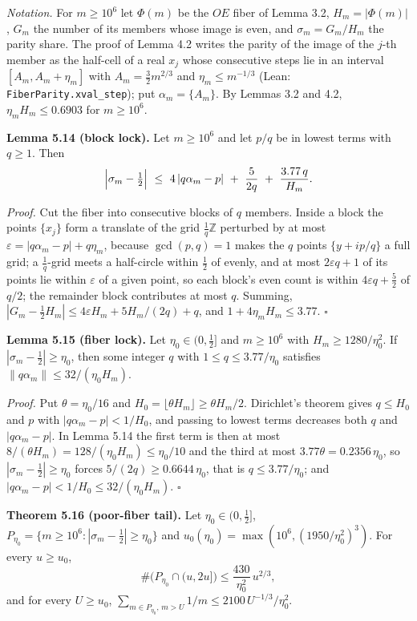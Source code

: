\documentclass[11pt,a4paper]{article}
\begin{document}
\emph{Notation.} For \(m\ge10^6\) let \(\Phi(m)\) be the \(OE\) fiber of
Lemma 3.2, \(H_m=|\Phi(m)|\), \(G_m\) the number of its members whose
image is even, and \(\sigma_m=G_m/H_m\) the parity share. The proof of
Lemma 4.2 writes the parity of the image of the \(j\)-th member as the
half-cell of a real \(x_j\) whose consecutive steps lie in an interval
\([A_m,A_m+\eta_m]\) with \(A_m=\tfrac32m^{2/3}\) and
\(\eta_m\le m^{-1/3}\) (Lean:
\texttt{\nolinkurl{FiberParity.xval_step}}); put \(\alpha_m=\{A_m\}\).
By Lemmas 3.2 and 4.2, \(\eta_mH_m\le0.6903\) for \(m\ge10^6\).

\textbf{Lemma 5.14 (block lock).} Let \(m\ge10^6\) and let \(p/q\) be in
lowest terms with \(q\ge1\). Then \[
\Bigl|\sigma_m-\tfrac12\Bigr|\ \le\
4\,|q\alpha_m-p|\ +\ \frac{5}{2q}\ +\ \frac{3.77\,q}{H_m}.
\]

\emph{Proof.} Cut the fiber into consecutive blocks of \(q\) members.
Inside a block the points \(\{x_j\}\) form a translate of the grid
\(\tfrac1q\mathbb Z\) perturbed by at most
\(\varepsilon=|q\alpha_m-p|+q\eta_m\), because \(\gcd(p,q)=1\) makes the
\(q\) points \(\{y+ip/q\}\) a full grid; a \(\tfrac1q\)-grid meets a
half-circle within \(\tfrac12\) of evenly, and at most
\(2\varepsilon q+1\) of its points lie within \(\varepsilon\) of a given
point, so each block's even count is within \(4\varepsilon q+\tfrac52\)
of \(q/2\); the remainder block contributes at most \(q\). Summing,
\(|G_m-\tfrac12H_m|\le4\varepsilon
H_m+5H_m/(2q)+q\), and \(1+4\eta_mH_m\le3.77\). \(\square\)

\textbf{Lemma 5.15 (fiber lock).} Let \(\eta_0\in(0,\tfrac12]\) and
\(m\ge10^6\) with \(H_m\ge1280/\eta_0^2\). If
\(|\sigma_m-\tfrac12|\ge\eta_0\), then some integer \(q\) with
\(1\le q\le3.77/\eta_0\) satisfies \(\|q\alpha_m\|\le32/(\eta_0H_m)\).

\emph{Proof.} Put \(\theta=\eta_0/16\) and
\(H_0=\lfloor\theta H_m\rfloor\ge
\theta H_m/2\). Dirichlet's theorem gives \(q\le H_0\) and \(p\) with
\(|q\alpha_m-p|<1/H_0\), and passing to lowest terms decreases both
\(q\) and \(|q\alpha_m-p|\). In Lemma 5.14 the first term is then at
most \(8/(\theta H_m)=128/(\eta_0H_m)\le\eta_0/10\) and the third at
most \(3.77\theta=0.2356\,\eta_0\), so \(|\sigma_m-\tfrac12|\ge\eta_0\)
forces \(5/(2q)\ge0.6644\,\eta_0\), that is \(q\le3.77/\eta_0\); and
\(|q\alpha_m-p|<1/H_0\le32/(\eta_0H_m)\). \(\square\)

\textbf{Theorem 5.16 (poor-fiber tail).} Let \(\eta_0\in(0,\tfrac12]\),
\(P_{\eta_0}=\{m\ge10^6:|\sigma_m-\tfrac12|\ge\eta_0\}\) and
\(u_0(\eta_0)=\max(10^6,(1950/\eta_0^2)^3)\). For every \(u\ge u_0\), \[
\#\bigl(P_{\eta_0}\cap(u,2u]\bigr)\le\frac{430}{\eta_0^2}\,u^{2/3},
\] and for every \(U\ge u_0\),
\(\sum_{m\in P_{\eta_0},\,m>U}1/m\le2100\,U^{-1/3}/\eta_0^2\).
\end{document}
